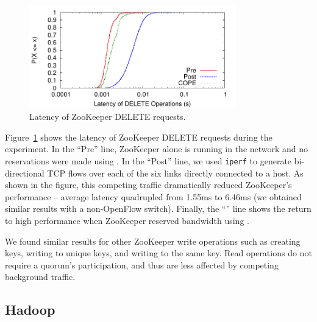 \begin{figure}[t]
\centering
\includegraphics[width=0.8\textwidth]{figs/DELETE-zk-latencies-logscale}
\caption{Latency of ZooKeeper DELETE requests.}
\label{fig:ZooKeeperDELETE}
\end{figure}

Figure~\ref{fig:ZooKeeperDELETE} shows the latency of ZooKeeper DELETE requests 
during the experiment. In the ``Pre'' line, ZooKeeper alone is running in the 
network and no reservations were made using \sys. In the ``Post'' line, we used 
\verb/iperf/ to generate bi-directional TCP flows over each of the six links 
directly connected to a host.
As shown in the 
figure, this competing traffic dramatically reduced ZooKeeper's performance -- 
average latency quadrupled from 1.55ms to 6.46ms (we obtained
similar results with a non-OpenFlow switch). Finally, the ``\sys'' line shows 
the return to high performance when ZooKeeper reserved bandwidth using \sys.

We found similar results for other ZooKeeper write operations such as creating 
keys, writing to unique keys, and writing to the same key. Read operations do 
not require a quorum's participation, and thus are less affected by competing background 
traffic.

\subsection{Hadoop}

